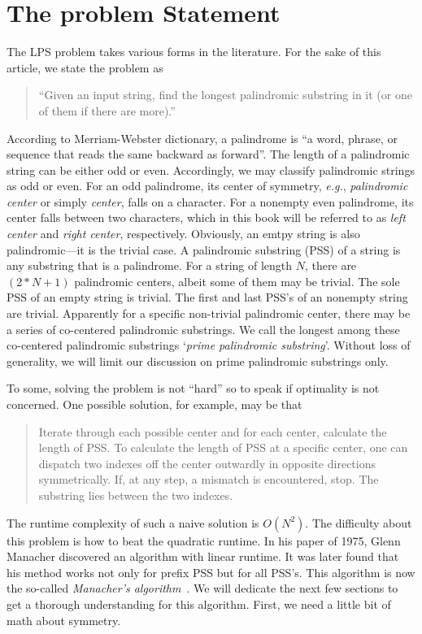 
\section{The problem Statement}\label{sec:lps-statement}

The LPS problem takes various forms in the literature.
For the sake of this article, we state the problem as
\begin{quote}
    ``Given an input string, find the longest palindromic substring in it (or one of them if
    there are more).''
\end{quote}
According to Merriam-Webster dictionary, a palindrome is ``a word, phrase, or sequence that reads
the same backward as forward''.
The length of a palindromic string can be either odd or even.
Accordingly, we may classify palindromic strings as odd or even.
For an odd palindrome, its center of symmetry, \textit{e.g.}, \emph{palindromic center}
or simply \emph{center}, falls on a character.
For a nonempty even palindrome, its center falls between two characters, which in this book
will be referred to as \emph{left center} and \emph{right center}, respectively.
Obviously, an emtpy string is also palindromic---it is the trivial case.
A palindromic substring (PSS) of a string is any substring that is a palindrome.
For a string of length $N$, there are $(2 * N + 1)$ palindromic centers, albeit some of
them may be trivial.
The sole PSS of an empty string is trivial.
The first and last PSS's of an nonempty string are trivial.
Apparently for a specific non-trivial palindromic center, there may be a series of co-centered
palindromic substrings.
We call the longest among these co-centered palindromic substrings
`\textit{prime palindromic substring}'.
Without loss of generality, we will limit our discussion on prime palindromic substrings only.


To some, solving the problem is not ``hard'' so to speak if optimality is not concerned.
One possible solution, for example, may be that
\begin{quotation}
    Iterate through each possible center and for each center, calculate the length of PSS\@.
    To calculate the length of PSS at a specific center, one can dispatch two indexes off the center
    outwardly in opposite directions symmetrically.
    If, at any step, a mismatch is encountered, stop.
    The substring lies between the two indexes.
\end{quotation}
The runtime complexity of such a naive solution is $O(N^2)$.
The difficulty about this problem is how to beat the quadratic runtime.
In his paper of 1975, Glenn Manacher discovered an algorithm with linear runtime.
It was later found that his method works not only for prefix PSS but for all PSS's.
This algorithm is now the so-called \textit{Manacher's algorithm}~\cite{Manacher:1975}.
We will dedicate the next few sections to get a thorough understanding for this algorithm.
First, we need a little bit of math about symmetry.


